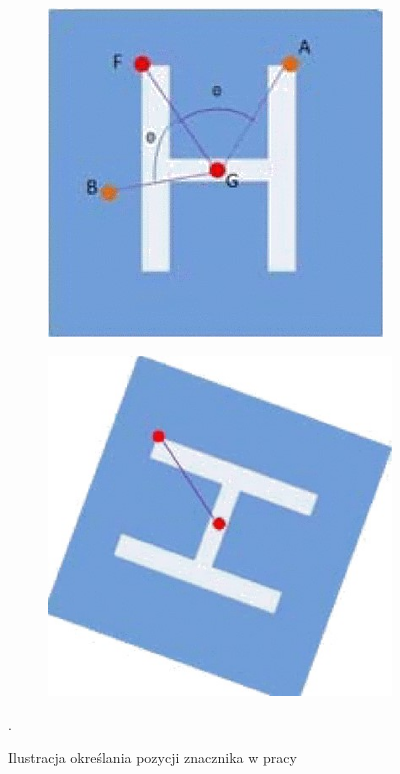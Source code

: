 \begin{figure}
	\centering
	\begin{subfigure}{0.4\textwidth}
		\centering
		\includegraphics[width=\textwidth]{pozycja_H_a.jpg}
		\caption{}
		\label{fig:pozycja_H_a}
	\end{subfigure}
	\begin{subfigure}{0.4\textwidth}
		\centering
		\includegraphics[width=\textwidth]{pozycja_H_b.jpg}
		\caption{}
		\label{fig:pozycja_H_b}
	\end{subfigure}%
	\caption{Ilustracja określania pozycji znacznika w pracy \cite{H} }.
	\label{fig:Znacznik_H_pozycja}
\end{figure}
